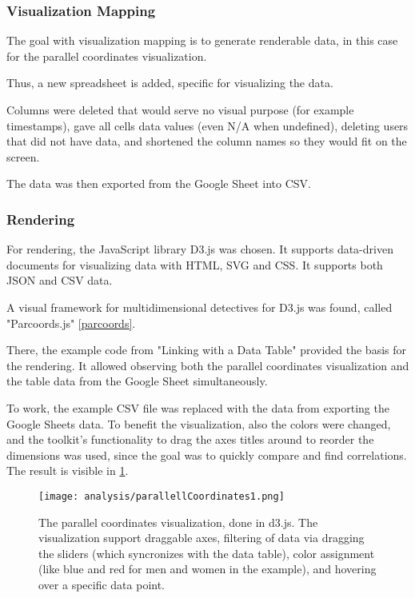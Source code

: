\subsubsection{Visualization Mapping}
The goal with visualization mapping is to generate renderable data, in this case for the parallel coordinates visualization.

Thus, a new spreadsheet is added, specific for visualizing the data.

Columns were deleted that would serve no visual purpose (for example timestamps), gave all cells data values (even N/A when undefined), deleting users that did not have data, and shortened the column names so they would fit on the screen.

The data was then exported from the Google Sheet into CSV.

\subsubsection{Rendering}

For rendering, the JavaScript library D3.js was chosen. It supports data-driven documents for visualizing data with HTML, SVG and CSS. It supports both JSON and CSV data.

A visual framework for multidimensional detectives for D3.js was found, called "Parcoords.js" \ref{parcoords}.

There, the example code from "Linking with a Data Table" provided the basis for the rendering. It allowed observing both the parallel coordinates visualization and the table data from the Google Sheet simultaneously. %

To work, the example CSV file was replaced with the data from exporting the Google Sheets data. To benefit the visualization, also the colors were changed, and the toolkit's functionality to drag the axes titles around to reorder the dimensions was used, since the goal was to quickly compare and find correlations. The result is visible in \ref{fig:parallell-coordinates-1}.

\begin{figure}[h]
    \centering
    \texttt{[image: analysis/parallellCoordinates1.png]}
    \caption{The parallel coordinates visualization, done in d3.js. The visualization support draggable axes, filtering of data via dragging the sliders (which syncronizes with the data table), color assignment (like blue and red for men and women in the example), and hovering over a specific data point.}
    \label{fig:parallell-coordinates-1}
\end{figure}
